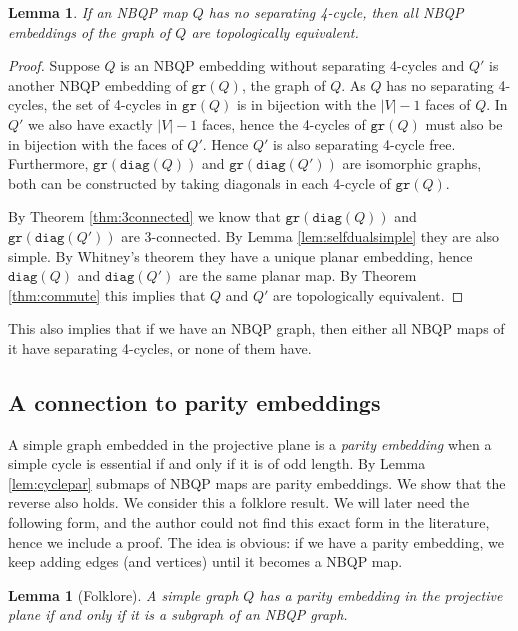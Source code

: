 \documentclass{article}
\newtheorem{lemma}[theorem]{Lemma}
\newcommand{\diag}[0]{\mathtt{diag}}
\newcommand{\gr}{\mathtt{gr}}
\begin{document}
\begin{lemma}    \label{lem:uniquestrduality}
     If an NBQP map $Q$ has no separating 4-cycle, then all NBQP embeddings of the graph of $Q$ are topologically equivalent.
\end{lemma}
\begin{proof}
    Suppose $Q$ is an NBQP embedding without separating 4-cycles and $Q'$ is another NBQP embedding of $\gr(Q)$, the graph of $Q$. As $Q$ has no separating 4-cycles, the set of 4-cycles in $\gr(Q)$ is in bijection with the $|V|-1$ faces of $Q$. In $Q'$ we also have exactly $|V|-1$ faces, hence the 4-cycles of $\gr(Q)$ must also be in bijection with the faces of $Q'$. Hence $Q'$ is also separating 4-cycle free.  Furthermore,  $\gr(\diag(Q))$ and $\gr(\diag(Q'))$ are isomorphic graphs, both can be constructed by taking diagonals in each 4-cycle of $\gr(Q)$. 
    
     By Theorem \ref{thm:3connected} we know that $\gr(\diag(Q))$ and  $\gr(\diag(Q'))$ are 3-connected. By Lemma \ref{lem:selfdualsimple} they are also simple. By Whitney's theorem they have a unique planar embedding, hence $\diag(Q)$ and $\diag(Q')$ are the same planar map. By Theorem \ref{thm:commute} this implies that $Q$ and $Q'$ are topologically equivalent.


\end{proof}


This also implies that if we have an NBQP graph, then either all NBQP maps of it have separating 4-cycles, or none of them have.

\subsection{A connection to parity embeddings}

 A simple graph embedded in the projective plane is a \emph{parity embedding} when a simple cycle is essential if and only if it is of odd length. By Lemma \ref{lem:cyclepar}  submaps of NBQP maps are parity embeddings. We show that the reverse also holds. We consider this a folklore result. We will later need the following form, and the author could not find  this exact form in the literature, hence we include a proof. The idea is obvious: if we have a parity embedding, we keep adding edges (and vertices) until it becomes a NBQP map. 


\begin{lemma}[Folklore]\label{lem:eqmaxcases}
    A simple graph $Q$ has a parity embedding in the projective plane if and only if it is a subgraph of an NBQP graph.
\end{lemma}
\end{document}
